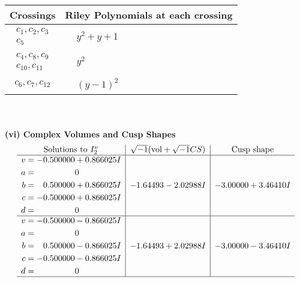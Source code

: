 \documentclass[1p]{elsarticle_modified}
\theoremstyle{definition}
\newcommand{\I}{\sqrt{-1}}
\begin{document}
\begin{tabular}{m{50pt}|m{274pt}}
Crossings & \hspace{64pt}Riley Polynomials at each crossing \\
\hline $$\begin{aligned}c_{1},c_{2},c_{3}\\c_{5}\end{aligned}$$&$\begin{aligned}
&y^2+y+1
\end{aligned}$\\
\hline $$\begin{aligned}c_{4},c_{8},c_{9}\\c_{10},c_{11}\end{aligned}$$&$\begin{aligned}
&y^2
\end{aligned}$\\
\hline $$\begin{aligned}c_{6},c_{7},c_{12}\end{aligned}$$&$\begin{aligned}
&(y-1)^2
\end{aligned}$\\
\hline
\end{tabular}\\~\\
\newpage\flushleft \textbf{(vi) Complex Volumes and Cusp Shapes}
$$\begin{array}{c|c|c}  
\text{Solutions to }I^v_{2}& \I (\text{vol} + \sqrt{-1}CS) & \text{Cusp shape}\\
 \hline 
\begin{aligned}
v &= -0.500000 + 0.866025 I \\
a &= \phantom{-0.000000 } 0 \\
b &= \phantom{-}0.500000 + 0.866025 I \\
c &= -0.500000 + 0.866025 I \\
d &= \phantom{-0.000000 } 0\end{aligned}
 & -1.64493 - 2.02988 I & -3.00000 + 3.46410 I \\ \hline\begin{aligned}
v &= -0.500000 - 0.866025 I \\
a &= \phantom{-0.000000 } 0 \\
b &= \phantom{-}0.500000 - 0.866025 I \\
c &= -0.500000 - 0.866025 I \\
d &= \phantom{-0.000000 } 0\end{aligned}
 & -1.64493 + 2.02988 I & -3.00000 - 3.46410 I\\
 \hline 
 \end{array}$$\newpage\newpage\renewcommand{\arraystretch}{1}
\end{document}
